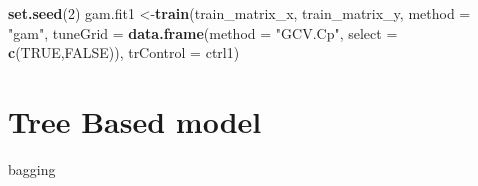 \documentclass[]{article}
\newenvironment{Shaded}{\begin{snugshade}}{\end{snugshade}}
\newcommand{\DataTypeTok}[1]{\textcolor[rgb]{0.13,0.29,0.53}{#1}}
\newcommand{\DecValTok}[1]{\textcolor[rgb]{0.00,0.00,0.81}{#1}}
\newcommand{\KeywordTok}[1]{\textcolor[rgb]{0.13,0.29,0.53}{\textbf{#1}}}
\newcommand{\NormalTok}[1]{#1}
\newcommand{\OperatorTok}[1]{\textcolor[rgb]{0.81,0.36,0.00}{\textbf{#1}}}
\newcommand{\OtherTok}[1]{\textcolor[rgb]{0.56,0.35,0.01}{#1}}
\newcommand{\StringTok}[1]{\textcolor[rgb]{0.31,0.60,0.02}{#1}}
\begin{document}
\begin{Shaded}
\end{Shaded}

\begin{Shaded}
\begin{Highlighting}[]
\KeywordTok{set.seed}\NormalTok{(}\DecValTok{2}\NormalTok{)}
\NormalTok{gam.fit1 <-}\KeywordTok{train}\NormalTok{(train_matrix_x,}
\NormalTok{                train_matrix_y,}
                \DataTypeTok{method =} \StringTok{"gam"}\NormalTok{,}
                \DataTypeTok{tuneGrid =} \KeywordTok{data.frame}\NormalTok{(}\DataTypeTok{method =} \StringTok{"GCV.Cp"}\NormalTok{,}
                                      \DataTypeTok{select =} \KeywordTok{c}\NormalTok{(}\OtherTok{TRUE}\NormalTok{,}\OtherTok{FALSE}\NormalTok{)),}
                \DataTypeTok{trControl =}\NormalTok{ ctrl1)}
\end{Highlighting}
\end{Shaded}

\hypertarget{tree-based-model}{%
\section{Tree Based model}\label{tree-based-model}}

bagging
\end{document}
